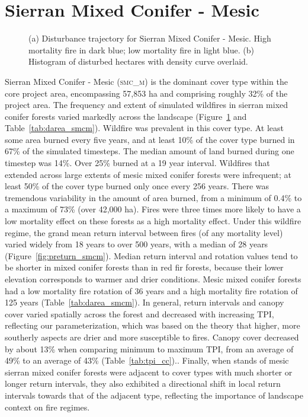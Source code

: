 \clearpage
\section{Sierran Mixed Conifer - Mesic} 

\begin{figure}[!htbp]
  \centering
  \caption{\small (a) Disturbance trajectory for Sierran Mixed Conifer - Mesic. High mortality fire in dark blue; low mortality fire in light blue. (b) Histogram of disturbed hectares with density curve overlaid.} 
  \label{fig:darea_smcm}
\end{figure}

Sierran Mixed Conifer - Mesic (\textsc{smc\_m}) is the dominant cover type within the core project area, encompassing 57,853 ha and comprising roughly 32\% of the project area. The frequency and extent of simulated wildfires in sierran mixed conifer forests varied markedly across the landscape (Figure~\ref{fig:darea_smcm} and Table~\ref{tab:darea_smcm}). %
%
Wildfire was prevalent in this cover type. At least some area burned every five years, and at least 10\% of the cover type burned in 67\% of the simulated timesteps. The median amount of land burned during one timestep was 14\%. Over 25\% burned at a 19 year interval. Wildfires that extended across large extents of mesic mixed conifer forests were infrequent; at least 50\% of the cover type burned only once every 256 years. There was tremendous variability in the amount of area burned, from a minimum of 0.4\% to a maximum of 73\% (over 42,000 ha). Fires were three times more likely to have a low mortality effect on these forests as a high mortality effect. %
%
Under this wildfire regime, the grand mean return interval between fires (of any mortality level) varied widely from 18 years to over 500 years, with a median of 28 years (Figure~\ref{fig:preturn_smcm}). Median return interval and rotation values tend to be shorter in mixed conifer forests than in red fir forests, because their lower elevation corresponds to warmer and drier conditions. Mesic mixed conifer forests had a low mortality fire rotation of 36 years and a high mortality fire rotation of 125 years (Table~\ref{tab:darea_smcm}).   %
%
In general, return intervals and canopy cover varied spatially across the forest and decreased with increasing TPI, reflecting our parameterization, which was based on the theory that higher, more southerly aspects are drier and more susceptible to fires. Canopy cover decreased by about 13\% when comparing minimum to maximum TPI, from an average of 49\% to an average of 43\% (Table~\ref{tab:tpi_cc})..  %
%
Finally, when stands of mesic sierran mixed conifer forests were adjacent to cover types with much shorter or longer return intervals, they also exhibited a directional shift in local return intervals towards that of the adjacent type, reflecting the importance of landscape context on fire regimes.

